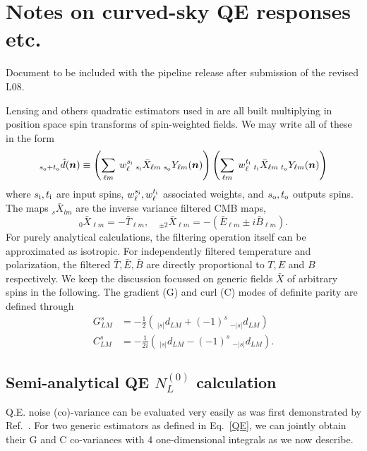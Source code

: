 \documentclass[reprint,prd, superscriptaddress, tightenlines, longbibliography, nofootinbib, eqsecnum, amsfonts, amsmath, floatfix, notitlepage, onecolumn]{revtex4-1}
\newcommand{\si}[0]{{s_{\rm i}}}
\newcommand{\ti}[0]{{t_{\rm i}}}
\newcommand{\so}[0]{{s_{\rm o}}}
\renewcommand{\to}[0]{{t_{\rm o}}}
\newcommand{\JC}[1]{\color{red}#1\color{black}}
\newcommand{\hn}[0]{\boldsymbol{n}}
\begin{document}
	
\tableofcontents

\section{   Notes on curved-sky QE responses etc.}
\JC{Document to be included with the pipeline release after submission of the revised L08.}

Lensing and others quadratic estimators used in \cite{??} are all built multiplying in position space spin transforms of spin-weighted fields. We may write all of these in the form \begin{equation}\label{QE}
 _{\so + \to}\hat d(\hn) \equiv  \left(\sum_{\ell m}\: w^{\si}_\ell \:_{\si} \bar X_{\ell m} \:_\so Y_{\ell m}(\hn)\right)\left(\sum_{\ell m}\:w^{\ti}_\ell  \:_{\ti} \bar X_{\ell m} \:_\to Y_{\ell m}(\hn)\right)
\end{equation}
where $\si, \ti$ are input spins, $w_\ell^\si, w_\ell^{\ti}$ associated weights, and  $\so, \to$ outputs spins. The maps $_s \bar X_{lm}$ are the inverse variance filtered CMB maps,
\begin{equation}
	_0 \bar X_{\ell m} = -\bar T_{\ell m} , \quad _{\pm 2} \bar X_{\ell m} = -\left(\bar E_{\ell m} \pm i\bar B_{\ell m} \right).
\end{equation}
For purely analytical calculations, the filtering operation itself can be approximated as isotropic. For independently filtered temperature and polarization, the filtered $\bar T, \bar E, \bar B$ are directly proportional to $T, E$ and $B$ respectively. 
We keep the discussion focussed on generic fields $\bar X$ of arbitrary spins in the following. The gradient (G) and curl (C) modes of definite parity are defined through
\begin{eqnarray*}
		G^{s}_{LM} &= -\frac 12\left(\:_{|s|} d_{LM} + (-1)^s \:_{-|s|} d_{LM}\right)  \\
		C^{s}_{LM} &=-\frac 1{2i} \left( \:_{|s|} d_{LM} - (-1)^s \:_{-|s|} d_{LM} \right) .
\end{eqnarray*}
\subsection{Semi-analytical QE $N^{(0)}_L$ calculation}
Q.E. noise (co)-variance can be evaluated very easily as was first demonstrated by Ref.~\cite{}. For two generic estimators as defined in Eq.~\eqref{QE}, we can jointly obtain their G and C co-variances with 4 one-dimensional integrals as we now describe.
\end{document}
